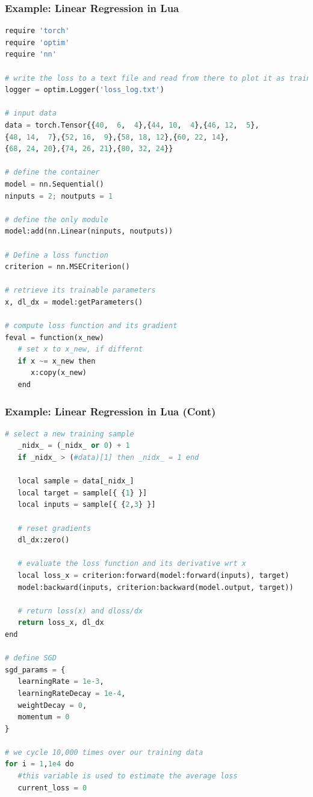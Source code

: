 
\begin{frame}[fragile]
\MyLogo
\frametitle{Example: Linear Regression in Lua}  
\scriptsize{
\begin{lstlisting}[language=python]
require 'torch'
require 'optim'
require 'nn'

# write the loss to a text file and read from there to plot it as training proceeds
logger = optim.Logger('loss_log.txt')

# input data 
data = torch.Tensor{{40,  6,  4},{44, 10,  4},{46, 12,  5},
{48, 14,  7},{52, 16,  9},{58, 18, 12},{60, 22, 14},
{68, 24, 20},{74, 26, 21},{80, 32, 24}}

# define the container
model = nn.Sequential()                 
ninputs = 2; noutputs = 1

# define the only module
model:add(nn.Linear(ninputs, noutputs)) 

# Define a loss function
criterion = nn.MSECriterion()

# retrieve its trainable parameters
x, dl_dx = model:getParameters()

# compute loss function and its gradient 
feval = function(x_new)
   # set x to x_new, if differnt
   if x ~= x_new then
      x:copy(x_new)
   end
\end{lstlisting}
}
\end{frame}

\begin{frame}[fragile]
\MyLogo
\frametitle{Example: Linear Regression in Lua (Cont)}  
\ContinueLineNumber
\scriptsize{
\begin{lstlisting}[language=python]
   # select a new training sample
   _nidx_ = (_nidx_ or 0) + 1
   if _nidx_ > (#data)[1] then _nidx_ = 1 end

   local sample = data[_nidx_]
   local target = sample[{ {1} }]    
   local inputs = sample[{ {2,3} }] 

   # reset gradients
   dl_dx:zero()
 
   # evaluate the loss function and its derivative wrt x
   local loss_x = criterion:forward(model:forward(inputs), target)
   model:backward(inputs, criterion:backward(model.output, target))

   # return loss(x) and dloss/dx
   return loss_x, dl_dx
end

# define SGD 
sgd_params = {
   learningRate = 1e-3,
   learningRateDecay = 1e-4,
   weightDecay = 0,
   momentum = 0
}

# we cycle 10,000 times over our training data
for i = 1,1e4 do
   #this variable is used to estimate the average loss
   current_loss = 0
\end{lstlisting}
}
\end{frame}

